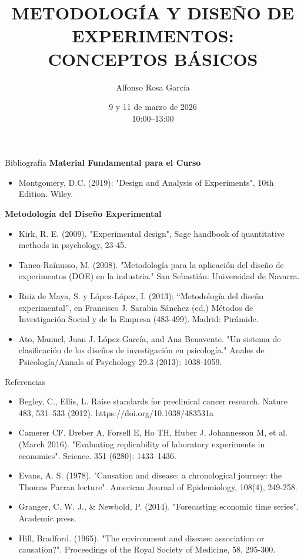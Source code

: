 ﻿\documentclass{beamer}
\title[DISEÑO DE EXPERIMENTOS]{METODOLOGÍA Y DISEÑO DE EXPERIMENTOS: \\ CONCEPTOS BÁSICOS}
\author[Alfonso Rosa García]{Alfonso Rosa García }
\institute[UM]{\textbf{Fundamentos del Análisis Económico} }
\date{9 y 11 de marzo de 2026 \\ 10:00--13:00}
\begin{document}
\begin{frame}
  \titlepage
\end{frame}

\begin{frame}{Bibliografía}
    \textbf{Material Fundamental para el Curso}
    \begin{itemize}
        \item Montgomery, D.C. (2019): "Design and Analysis of Experiments", 10th Edition. Wiley.
    \end{itemize}
    
    \textbf{Metodología del Diseño Experimental}
    \begin{itemize}
        \item Kirk, R. E. (2009). "Experimental design", Sage handbook of quantitative methods in psychology, 23-45.        
        \item Tanco-Raínusso, M. (2008). "Metodología para la aplicación del diseño de experimentos (DOE) en la industria." San Sebastián: Universidad de Navarra.
        \item Ruiz de Maya, S. y López-López, I. (2013): “Metodología del diseño experimental”, en Francisco J. Sarabia Sánchez (ed.) Métodos de Investigación Social y de la Empresa (483-499). Madrid: Pirámide.
        \item Ato, Manuel, Juan J. López-García, and Ana Benavente. "Un sistema de clasificación de los diseños de investigación en psicología." Anales de Psicología/Annals of Psychology 29.3 (2013): 1038-1059.        
    \end{itemize}
\end{frame}

\begin{frame}{Referencias}
   \begin{itemize}
        \item Begley, C., Ellis, L. Raise standards for preclinical cancer research. Nature 483, 531–533 (2012). https://doi.org/10.1038/483531a
        \item Camerer CF, Dreber A, Forsell E, Ho TH, Huber J, Johannesson M, et al. (March 2016). "Evaluating replicability of laboratory experiments in economics". Science. 351 (6280): 1433–1436.     
        \item Evans, A. S. (1978). "Causation and disease: a chronological journey: the Thomas Parran lecture". American Journal of Epidemiology, 108(4), 249-258.
        \item Granger, C. W. J., \& Newbold, P. (2014). "Forecasting economic time series". Academic press.
        \item Hill, Bradford. (1965). "The environment and disease: association or causation?". Proceedings of the Royal Society of Medicine, 58, 295-300.    
    \end{itemize}
    
\end{frame}
\end{document}
